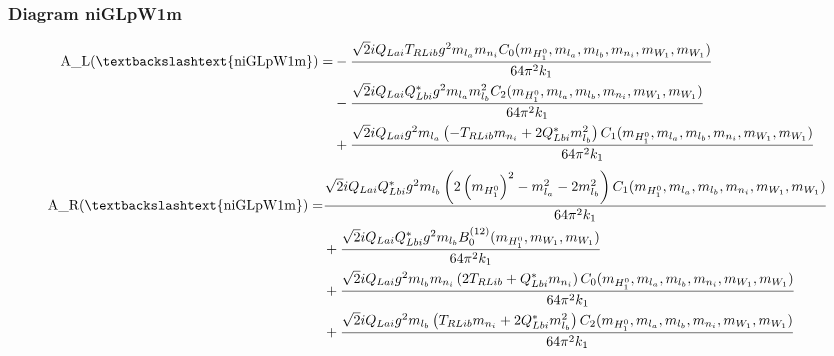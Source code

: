 \documentclass{article}
\begin{document}
\subsubsection{Diagram niGLpW1m}
\begin{align*}
\mathtt{\text{A\_L(\textbackslashtext\{niGLpW1m\})}} = &- \frac{\sqrt{2} i Q_{Lai} T_{RLib} g^{2} m_{l_a} m_{n_i} C_0(m_{H_1^0}, m_{l_a}, m_{l_b}, m_{n_i}, m_{W_1}, m_{W_1})}{64 \pi^{2} k_{1}} \\
& - \frac{\sqrt{2} i Q_{Lai} Q_{Lbi}^* g^{2} m_{l_a} m_{l_b}^{2} C_2(m_{H_1^0}, m_{l_a}, m_{l_b}, m_{n_i}, m_{W_1}, m_{W_1})}{64 \pi^{2} k_{1}} \\
& + \frac{\sqrt{2} i Q_{Lai} g^{2} m_{l_a} \left(- T_{RLib} m_{n_i} + 2 Q_{Lbi}^* m_{l_b}^{2}\right) C_1(m_{H_1^0}, m_{l_a}, m_{l_b}, m_{n_i}, m_{W_1}, m_{W_1})}{64 \pi^{2} k_{1}} 
\end{align*}
\begin{align*}
\mathtt{\text{A\_R(\textbackslashtext\{niGLpW1m\})}} = & \frac{\sqrt{2} i Q_{Lai} Q_{Lbi}^* g^{2} m_{l_b} \left(2 \left(m_{H_1^0}\right)^{2} - m_{l_a}^{2} - 2 m_{l_b}^{2}\right) C_1(m_{H_1^0}, m_{l_a}, m_{l_b}, m_{n_i}, m_{W_1}, m_{W_1})}{64 \pi^{2} k_{1}} \\
& + \frac{\sqrt{2} i Q_{Lai} Q_{Lbi}^* g^{2} m_{l_b} B^{\left(12\right)}_0(m_{H_1^0}, m_{W_1}, m_{W_1})}{64 \pi^{2} k_{1}} \\
& + \frac{\sqrt{2} i Q_{Lai} g^{2} m_{l_b} m_{n_i} \left(2 T_{RLib} + Q_{Lbi}^* m_{n_i}\right) C_0(m_{H_1^0}, m_{l_a}, m_{l_b}, m_{n_i}, m_{W_1}, m_{W_1})}{64 \pi^{2} k_{1}} \\
& + \frac{\sqrt{2} i Q_{Lai} g^{2} m_{l_b} \left(T_{RLib} m_{n_i} + 2 Q_{Lbi}^* m_{l_b}^{2}\right) C_2(m_{H_1^0}, m_{l_a}, m_{l_b}, m_{n_i}, m_{W_1}, m_{W_1})}{64 \pi^{2} k_{1}} 
\end{align*}
\end{document}
